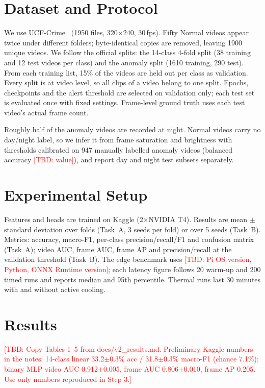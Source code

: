 \documentclass[journal]{IEEEtran}
\newcommand{\TBD}[1]{\textcolor{red}{[TBD: #1]}}
\begin{document}
\section{Dataset and Protocol}\label{sec:data}
We use UCF-Crime~\cite{sultani2018} (1950 files, 320$\times$240, 30\,fps). Fifty Normal videos
appear twice under different folders; byte-identical copies are removed, leaving 1900 unique
videos. We follow the official splits: the 14-class 4-fold split (38 training and 12 test videos
per class) and the anomaly split (1610 training, 290 test). From each training list, 15\% of the
videos are held out per class as validation. Every split is at video level, so all clips of a
video belong to one split. Epochs, checkpoints and the alert threshold are selected on validation
only; each test set is evaluated once with fixed settings. Frame-level ground truth uses each
test video's actual frame count.

Roughly half of the anomaly videos are recorded at night. Normal videos carry no day/night
label, so we infer it from frame saturation and brightness with thresholds calibrated on 947
manually labelled anomaly videos (balanced accuracy \TBD{value}), and report day and night
test subsets separately.

\section{Experimental Setup}
Features and heads are trained on Kaggle (2$\times$NVIDIA T4). Results are mean $\pm$ standard
deviation over folds (Task~A, 3 seeds per fold) or over 5 seeds (Task~B). Metrics: accuracy,
macro-F1, per-class precision/recall/F1 and confusion matrix (Task~A); video AUC, frame AUC,
frame AP and precision/recall at the validation threshold (Task~B). The edge benchmark uses
\TBD{Pi OS version, Python, ONNX Runtime version}; each latency figure follows 20 warm-up and
200 timed runs and reports median and 95th percentile. Thermal runs last 30 minutes with and
without active cooling.

\section{Results}\label{sec:results}
\TBD{Copy Tables 1--5 from docs/v2_results.md. Preliminary Kaggle numbers in the notes:
14-class linear 33.2$\pm$0.3\% acc / 31.8$\pm$0.3\% macro-F1 (chance 7.1\%);
binary MLP video AUC 0.912$\pm$0.005, frame AUC 0.806$\pm$0.010, frame AP 0.205.
Use only numbers reproduced in Step 3.}
\end{document}
